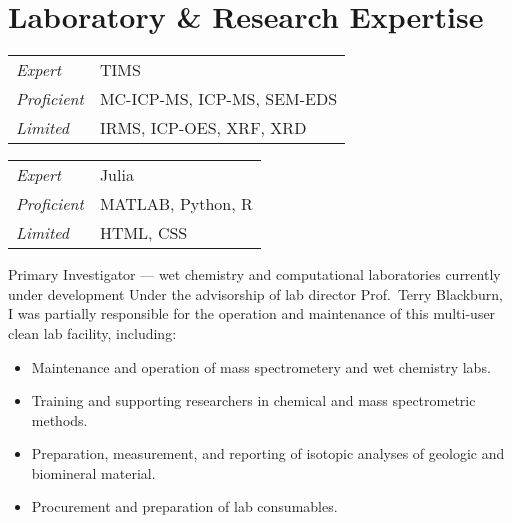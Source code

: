 \section{Laboratory \& Research Expertise}

\begin{tabular}{ll}
	\itshape Expert & TIMS \\
	\itshape Proficient & MC-ICP-MS, ICP-MS, SEM-EDS \\
	\itshape Limited & IRMS, ICP-OES, XRF, XRD
\end{tabular}

\begin{tabular}{ll}
	\itshape Expert & Julia \\
	\itshape Proficient & MATLAB, Python, R \\
	\itshape Limited & HTML, CSS
\end{tabular}

Primary Investigator --- wet chemistry and computational laboratories currently under development
Under the advisorship of lab director Prof.~Terry Blackburn, I was partially responsible for the operation and maintenance of this multi-user clean lab facility, including:
	\begin{itemize} 
	\item Maintenance and operation of mass spectrometery and wet chemistry labs.
	\item Training and supporting researchers in chemical and mass spectrometric methods.
	\item Preparation, measurement, and reporting of isotopic analyses of geologic and biomineral material.
	\item Procurement and preparation of lab consumables.
	\end{itemize}